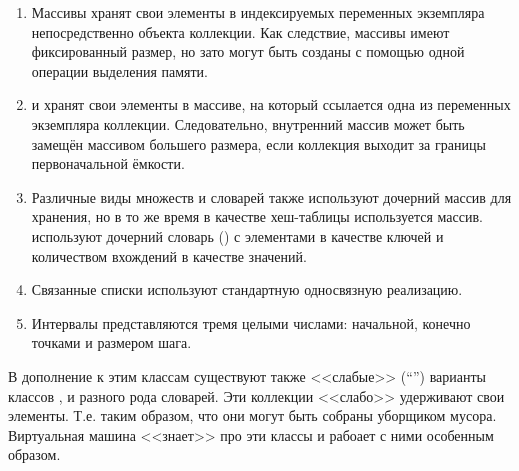 \documentclass[a4paper,10pt,twoside]{book}
\begin{document}
\begin{enumerate}
  \item Массивы хранят свои элементы в индексируемых переменных экземпляра непосредственно объекта коллекции. Как следствие, массивы имеют фиксированный размер, но зато могут быть созданы с помощью одной операции выделения памяти.
  \item {} и  хранят свои элементы в массиве, на который ссылается одна из переменных экземпляра коллекции.
Следовательно, внутренний массив может быть замещён массивом большего размера, если коллекция выходит за границы первоначальной ёмкости.
  \item Различные виды множеств и словарей также используют дочерний массив для хранения, но в то же время в качестве хеш-таблицы используется массив.  используют дочерний словарь () с элементами  в качестве ключей и количеством вхождений в качестве значений.
  \item Связанные списки используют стандартную односвязную реализацию.
  \item Интервалы представляются тремя целыми числами: начальной, конечно точками и размером шага.
\end{enumerate}
В дополнение к этим классам существуют также <<слабые>> (``'') варианты классов ,  и разного рода словарей. Эти коллекции <<слабо>> удерживают свои элементы. Т.е. таким образом, что они могут быть собраны уборщиком мусора.
Виртуальная машина \pharo <<знает>> про эти классы и рабоает с ними особенным образом.
\end{document}
